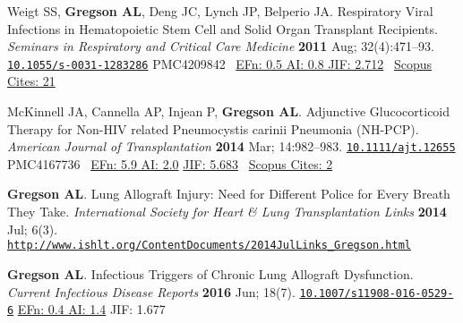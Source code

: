 \documentclass[letterpaper,11pt,sans,dvipsnames,final]{/usr/local/share/texmf-dist/tex/latex/moderncv/moderncv}%
\begin{document}
\begin{thebibliography}{1}
  \bibitem[4]{} Weigt SS, \textbf{Gregson AL}, Deng JC, Lynch JP, Belperio JA. Respiratory Viral Infections in Hematopoietic Stem Cell and Solid Organ Transplant Recipients. {\color{BrickRed}\textit{Seminars in Respiratory and Critical Care Medicine}} \textbf{2011} Aug; 32(4):471--93. \href{http://dx.doi.org/10.1055/s-0031-1283286}{\nolinkurl{10.1055/s-0031-1283286}} {\smaller PMC4209842}~ 
    {\color{NavyBlue} \href{http://www.eigenfactor.org/rankings.php?search=SEMINARS+IN+RESPIRATORY+AND+CRITICAL+CARE+MEDICINE&search2=&search3=&searchby=journal}{{\smaller EFn: 0.5 AI: 0.8 JIF: 2.712}}~
      \href{http://www.scopus.com/record/display.uri?eid=2-s2.0-80051960857&origin=resultslist&sort=plf-f&src=s&nlo=1&nlr=20&nls=&sid=4E3F003C86CD3B740CA1877B02032D8B.y7ESLndDIsN8cE7qwvy6w%3a3832&sot=anl&sdt=aut&sl=36&s=AU-ID%28%22Gregson%2c+Aric+L.%22+6603096521%29&relpos=10&citeCnt=21&searchTerm=AU-ID%28%5C%26quot%3BGregson%2C+Aric+L.%5C%26quot%3B+6603096521%29}{{\smaller Scopus Cites: 21}}
      }

  \bibitem[5]{} McKinnell JA, Cannella AP, Injean P, \textbf{Gregson AL}. Adjunctive Glucocorticoid Therapy for Non-{\smaller HIV} related Pneumocystis carinii Pneumonia ({\smaller NH-PCP}).
{\color{BrickRed}\textit{American Journal of Transplantation}} \textbf{2014} Mar; 14:982--983. \href{http://dx.doi.org/10.1111/ajt.12655}{\nolinkurl{10.1111/ajt.12655}} {\smaller PMC4167736}~
       {\color{NavyBlue}\href{http://52.6.43.8/projects/journalRank/rankings.php?bsearch=AMERICAN+JOURNAL+OF+TRANSPLANTATION&searchby=journal&orderby=eigenfactor}{{\smaller EFn: 5.9 AI: 2.0}} 
       \href{http://admin-apps.webofknowledge.com/JCR/JCR?RQ=RECORD&rank=1&journal=AM+J+TRANSPLANT}{{\smaller JIF: 5.683}}~
       \href{http://www.scopus.com/record/display.uri?eid=2-s2.0-84897116000&origin=resultslist&sort=plf-f&src=s&st1=&st2=&nlo=1&nlr=20&nls=&sid=4E3F003C86CD3B740CA1877B02032D8B.y7ESLndDIsN8cE7qwvy6w%3a2832&sot=anl&sdt=aut&sl=36&s=AU-ID%28%22Gregson%2c+Aric+L.%22+6603096521%29&relpos=4&citeCnt=2&searchTerm=AU-ID%28%5C%26quot%3BGregson%2C+Aric+L.%5C%26quot%3B+6603096521%29}{{\smaller Scopus Cites: 2}}
       }

  \bibitem[6]{} \textbf{Gregson AL}. Lung Allograft Injury: Need for Different Police for Every Breath They Take.
{\color{BrickRed}\textit{International Society for Heart \& Lung Transplantation Links}} \textbf{2014} Jul; 6(3). \href{http://www.ishlt.org/ContentDocuments/2014JulLinks_Gregson.html}{\nolinkurl{http://www.ishlt.org/ContentDocuments/2014JulLinks_Gregson.html}}

  \bibitem[7]{} \textbf{Gregson AL}. Infectious Triggers of Chronic Lung Allograft Dysfunction. {\color{BrickRed}\textit{Current Infectious Disease Reports}} \textbf{2016} Jun; 18(7). \href{}{\nolinkurl{10.1007/s11908-016-0529-6}}
{\color{NavyBlue}\href{http://52.6.43.8/projects/journalRank/rankings.php?bsearch=Current+Infectious+Disease+Reports&searchby=journal&orderby=eigenfactor}{{\smaller EFn: 0.4  AI: 1.4}}
       {\smaller JIF: 1.677}~
       }



\end{thebibliography}
\end{document}
